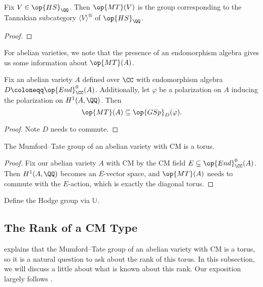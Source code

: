 \documentclass{article}
\begin{document}
\begin{corollary}
	Fix $V\in\op{HS}_\QQ$. Then $\op{MT}(V)$ is the group corresponding to the Tannakian subcategory $\langle V\rangle^{\otimes}$ of $\op{HS}_\QQ$.
\end{corollary}
\begin{proof}
	\todo{}
\end{proof}
For abelian varieties, we note that the presence of an endomorphism algebra gives us some information about $\op{MT}(A)$.
\begin{proposition}
	Fix an abelian variety $A$ defined over $\CC$ with endomorphism algebra $D\coloneqq\op{End}^0_\CC(A)$. Additionally, let $\varphi$ be a polarization on $A$ inducing the polarization on $H^1(A,\QQ)$. Then
	\[\op{MT}(A)\subseteq\op{GSp}_D(\varphi).\]
\end{proposition}
\begin{proof}
	Note $D$ needs to commute.\todo{}
\end{proof}
\begin{corollary} \label{prop:mt-cm-torus}
	The Mumford--Tate group of an abelian variety with CM is a torus.
\end{corollary}
\begin{proof}
	Fix our abelian variety $A$ with CM by the CM field $E\subseteq\op{End}^0_\CC(A)$. Then $H^1(A,\QQ)$ becomes an $E$-vector space, and $\op{MT}(A)$ needs to commute with the $E$-action, which is exactly the diagonal torus.
\end{proof}
Define the Hodge group via $\mathbb U$.\todo{}

\subsection{The Rank of a CM Type}
 explains that the Mumford--Tate group of an abelian variety with CM is a torus, so it is a natural question to ask about the rank of this torus. In this subsection, we will discuss a little about what is known about this rank. Our exposition largely follows \cite[Section~6.1]{lang-cm}.
\end{document}
